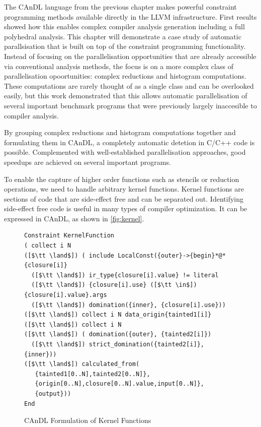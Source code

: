 
    The CAnDL language from the previous chapter makes powerful constraint
    programming methods available directly in the LLVM infrastructure.
    First results showed how this enables complex compiler analysis generation
    including a full polyhedral analysis.
    This chapter will demonstrate a case study of automatic parallsisation that
    is built on top of the constraint programming functionality.
    Instead of focusing on the parallelisation opportunities that are already
    accessible via conventional analysis methods, the focus is on a more complex
    class of parallelisation opoortunities: complex reductions and histogram
    computations.
    These computations are rarely thought of as a single class and can be
    overlooked easily, but this work demonstrated that this allows automatic
    parallelisation of several  important benchmark programs that were
    previously largely inaccesible to
    compiler analysis.

    By grouping complex reductions and histogram computations together and
    formulating them in CAnDL, a completely automatic detetion in C/C++ code is
    possible.
    Complemented with well-established parallelisation approaches, good speedups
    are achieved on several important programs.

\newpage

    To enable the capture of higher order functions such as stencils or
    reduction operations, we need to handle arbitrary kernel functions.
    Kernel functions are sections of code that are side-effect free and
    can be separated out. Identifying side-effect free code is useful in
    many types of compiler optimization.  It can be expressed in CAnDL, as
    shown in \autoref{fig:kernel}.

\begin{figure}[ht]
\begin{lstlisting}[language=CAnDL]
Constraint KernelFunction
( collect i N
([$\tt \land$]) ( include LocalConst({outer}->{begin}*@*{closure[i]}
  ([$\tt \land$]) ir_type{closure[i].value} != literal
  ([$\tt \land$]) {closure[i].use} ([$\tt \in$]) {closure[i].value}.args
  ([$\tt \land$]) domination({inner}, {closure[i].use}))
([$\tt \land$]) collect i N data_origin{tainted1[i]}
([$\tt \land$]) collect i N
([$\tt \land$]) ( domination({outer}, {tainted2[i]})
  ([$\tt \land$]) strict_domination({tainted2[i]}, {inner}))
([$\tt \land$]) calculated_from(
   {tainted1[0..N],tainted2[0..N]},
   {origin[0..N],closure[0..N].value,input[0..N]},
   {output}))
End
\end{lstlisting}
\vspace{-0.3cm}
\caption{CAnDL Formulation of Kernel Functions}
\label{fig:kernel}
\end{figure}

